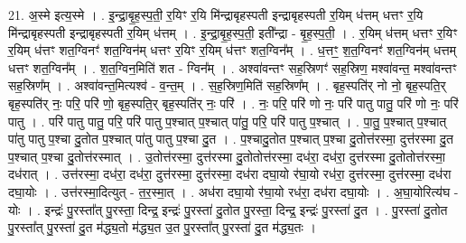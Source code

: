\documentclass[17pt]{extarticle}
\begin{document}
21. अ॒स्मे इत्य॒स्मे । . इ॒न्द्रा॒बृ॒ह॒स्प॒ती॒ र॒यिꣳ र॒यि मि॑न्द्राबृहस्पती इन्द्राबृहस्पती र॒यिम् ध॑त्तम् धत्तꣳ र॒यि मि॑न्द्राबृहस्पती इन्द्राबृहस्पती र॒यिम् ध॑त्तम् । . इ॒न्द्रा॒बृ॒ह॒स्प॒ती॒ इती᳚न्द्रा - बृ॒ह॒स्प॒ती॒ । . र॒यिम् ध॑त्तम् धत्तꣳ र॒यिꣳ र॒यिम् ध॑त्तꣳ शत॒ग्विनꣳ॑ शत॒ग्विन॑म् धत्तꣳ र॒यिꣳ र॒यिम् ध॑त्तꣳ शत॒ग्विन᳚म् । . ध॒त्तꣳ॒॒ श॒त॒ग्विनꣳ॑ शत॒ग्विन॑म् धत्तम् धत्तꣳ शत॒ग्विन᳚म् । . श॒त॒ग्विन॒मिति॑ शत - ग्विन᳚म् । . अश्वा॑वन्तꣳ सह॒स्रिणꣳ॑ सह॒स्रिण॒ मश्वा॑वन्त॒ मश्वा॑वन्तꣳ सह॒स्रिण᳚म् । . अश्वा॑वन्त॒मित्यश्व॑ - व॒न्त॒म् । . स॒ह॒स्रिण॒मिति॑ सह॒स्रिण᳚म् । . बृह॒स्पति॑र् नो नो॒ बृह॒स्पति॒र् बृह॒स्पति॑र् नः॒ परि॒ परि॑ णो॒ बृह॒स्पति॒र् बृह॒स्पति॑र् नः॒ परि॑ । . नः॒ परि॒ परि॑ णो नः॒ परि॑ पातु पातु॒ परि॑ णो नः॒ परि॑ पातु । . परि॑ पातु पातु॒ परि॒ परि॑ पातु प॒श्चात् प॒श्चात् पा॑तु॒ परि॒ परि॑ पातु प॒श्चात् । . पा॒तु॒ प॒श्चात् प॒श्चात् पा॑तु पातु प॒श्चा दु॒तोत प॒श्चात् पा॑तु पातु प॒श्चा दु॒त । . प॒श्चादु॒तोत प॒श्चात् प॒श्चा दु॒तोत्त॑रस्मा॒ दुत्त॑रस्मा दु॒त प॒श्चात् प॒श्चा दु॒तोत्त॑रस्मात् । . उ॒तोत्त॑रस्मा॒ दुत्त॑रस्मा दु॒तोतोत्त॑रस्मा॒ दध॑रा॒ दध॑रा॒ दुत्त॑रस्मा दु॒तोतोत्त॑रस्मा॒ दध॑रात् । . उत्त॑रस्मा॒ दध॑रा॒ दध॑रा॒ दुत्त॑रस्मा॒ दुत्त॑रस्मा॒ दध॑रा दघा॒यो र॑घा॒यो रध॑रा॒ दुत्त॑रस्मा॒ दुत्त॑रस्मा॒ दध॑रा दघा॒योः । . उत्त॑रस्मा॒दित्युत् - त॒र॒स्मा॒त् । . अध॑रा दघा॒यो र॑घा॒यो रध॑रा॒ दध॑रा दघा॒योः । . अ॒घा॒योरित्य॑घ - योः । . इन्द्रः॑ पु॒रस्ता᳚त् पु॒रस्ता॒ दिन्द्र॒ इन्द्रः॑ पु॒रस्ता॑ दु॒तोत पु॒रस्ता॒ दिन्द्र॒ इन्द्रः॑ पु॒रस्ता॑ दु॒त । . पु॒रस्ता॑ दु॒तोत पु॒रस्ता᳚त् पु॒रस्ता॑ दु॒त म॑द्ध्य॒तो म॑द्ध्य॒त उ॒त पु॒रस्ता᳚त् पु॒रस्ता॑ दु॒त म॑द्ध्य॒तः । \newline
\end{document}
